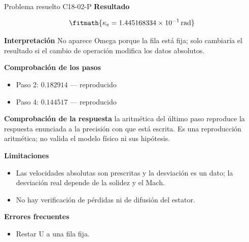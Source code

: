 \documentclass[10pt,openany]{book}
\begin{document}
\begin{studiumworked}{Problema resuelto C18-02-P}
\noindent\textbf{Resultado}

\[
\fitmath{\kappa_e=1.445168334\times10^{-1}\,\mathrm{rad}}
\]

\noindent\textbf{Interpretación}
No aparece Omega porque la fila está fija; solo cambiaría el resultado si el cambio de operación modifica los datos absolutos.

\noindent\textbf{Comprobación de los pasos}
\begin{itemize}
\item Paso 2: $0.182914$ — reproducido
\item Paso 4: $0.144517$ — reproducido
\end{itemize}

\noindent\textbf{Comprobación de la respuesta} la aritmética del último paso reproduce la respuesta enunciada a la precisión con que está escrita. Es una reproducción aritmética; no valida el modelo físico ni sus hipótesis.

\noindent\textbf{Limitaciones}
\begin{itemize}
\item Las velocidades absolutas son prescritas y la desviación es un dato; la desviación real depende de la solidez y el Mach.
\item No hay verificación de pérdidas ni de difusión del estator.
\end{itemize}

\noindent\textbf{Errores frecuentes}
\begin{itemize}
\item Restar U a una fila fija.
\end{itemize}
\end{studiumworked}
\end{document}
